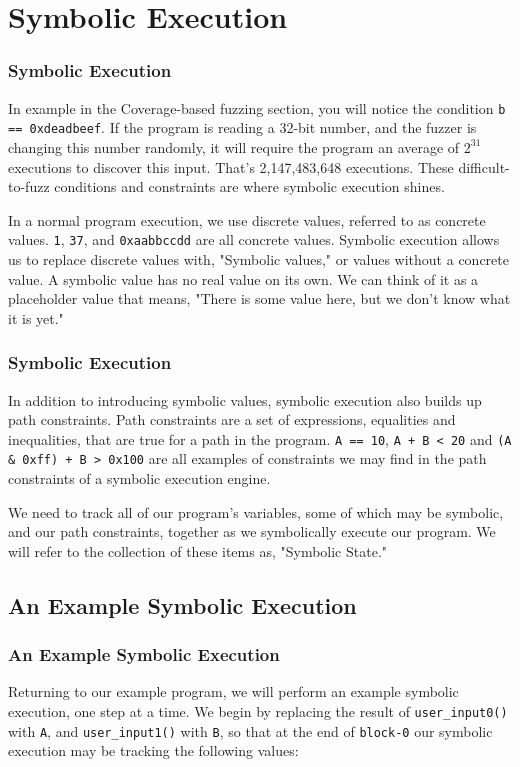 \documentclass{beamer}
\begin{document}
\section{Symbolic Execution}
\begin{frame}
\frametitle{Symbolic Execution}
In example in the Coverage-based fuzzing section, you will notice the condition \texttt{b == 0xdeadbeef}. If the program is reading a 32-bit number, and the fuzzer is changing this number randomly, it will require the program an average of \(2^31\) executions to discover this input. That's 2,147,483,648 executions. These difficult-to-fuzz conditions and constraints are where symbolic execution shines.

In a normal program execution, we use discrete values, referred to as concrete values. \texttt{1}, \texttt{37}, and \texttt{0xaabbccdd} are all concrete values. Symbolic execution allows us to replace discrete values with, "Symbolic values," or values without a concrete value. A symbolic value has no real value on its own. We can think of it as a placeholder value that means, "There is some value here, but we don't know what it is yet."
\end{frame}

\begin{frame}
\frametitle{Symbolic Execution}
In addition to introducing symbolic values, symbolic execution also builds up path constraints. Path constraints are a set of expressions, equalities and inequalities, that are true for a path in the program. \texttt{A == 10}, \texttt{A + B < 20} and \texttt{(A {\&} 0xff) + B > 0x100} are all examples of constraints we may find in the path constraints of a symbolic execution engine.

We need to track all of our program's variables, some of which may be symbolic, and our path constraints, together as we symbolically execute our program. We will refer to the collection of these items as, "Symbolic State."
\end{frame}

\subsection{An Example Symbolic Execution}

\begin{frame}
\frametitle{An Example Symbolic Execution}
Returning to our example program, we will perform an example symbolic execution, one step at a time. We begin by replacing the result of \texttt{user\_input0()} with \texttt{A}, and \texttt{user\_input1()} with \texttt{B}, so that at the end of \texttt{block-0} our symbolic execution may be tracking the following values:
\end{frame}
\end{document}
